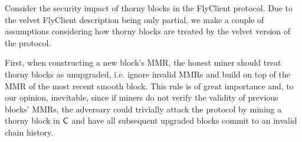 	Consider the security impact of thorny blocks in the FlyClient protocol.
	Due to the velvet FlyClient description being only partial, we
	make a couple of assumptions considering how thorny blocks are treated by the velvet version of the protocol.

	First, when constructing a new block's MMR, the honest miner should treat thorny blocks as unupgraded, 
	i.e. ignore invalid MMRs and build on top of the MMR of the most recent smooth block. 
	This rule is of great importance and, to our opinion, inevitable, since if miners do not verify the 
	validity of previous blocks' MMRs, the adversary could trivially attack the protocol by mining a thorny block in $\mathsf{C}$ and have all subsequent upgraded
	blocks commit to an invalid chain history.  
	
